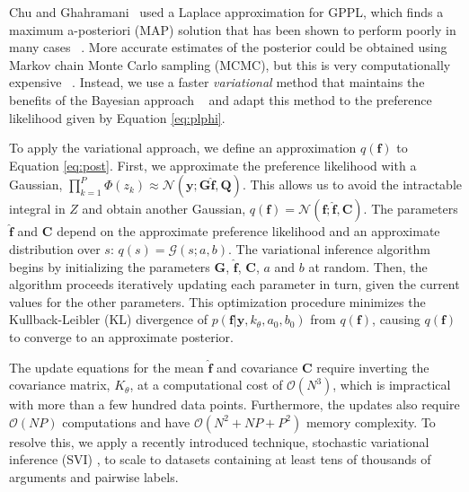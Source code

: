 Chu and Ghahramani~
used a Laplace approximation for GPPL, which finds a maximum a-posteriori (MAP) solution
that has been shown to perform poorly in many cases
~\cite{nickisch2008approximations}. 
More accurate estimates of the posterior could be obtained using Markov chain Monte Carlo sampling (MCMC),
but this is very computationally expensive ~\cite{nickisch2008approximations}. 
Instead, we use a faster \emph{variational} method that maintains the benefits of the Bayesian approach
~\cite{reece2011determining,steinberg2014extended} and adapt this method 
to the preference likelihood given by Equation \ref{eq:plphi}.

To apply the variational approach, we define an approximation $q(\mathbf f)$ to Equation \ref{eq:post}. 
First, we approximate the preference likelihood with a Gaussian, $\prod_{k=1}^P \Phi\left( z_k \right) \approx \mathcal{N}(\mathbf y; \mathbf G\hat{\mathbf f}, \mathbf Q)$. This allows us to avoid the intractable integral in $Z$ and obtain another Gaussian, $q(\mathbf f) = \mathcal{N}(\mathbf f; \hat{\mathbf f}, \mathbf C)$. 
The parameters $\hat{\mathbf f}$ and $\mathbf C$ 
depend on the approximate preference likelihood 
and an approximate distribution over $s$: $q(s) = \mathcal{G}(s; a, b)$. 
The variational inference algorithm begins by initializing the parameters $\mathbf G$, $ \hat{\mathbf f}$, $\mathbf C$, $a$ and $b$ at random. Then, the  algorithm proceeds iteratively updating each parameter in turn, given the current values for the other parameters. 
This optimization procedure minimizes the Kullback-Leibler (KL) divergence of $p(\mathbf f |\mathbf y, k_{\theta}, a_0, b_0)$ from $q(\mathbf f)$, causing $q(\mathbf f)$ to converge to an approximate posterior. 

The update equations for the mean $\hat{\mathbf f}$ and covariance $\mathbf C$ require inverting the covariance matrix, $K_{\theta}$, at a computational cost of $\mathcal{O}(N^3)$, which is impractical with more than a few hundred data points. 
Furthermore, the updates also require $\mathcal{O}(NP)$ computations and
have $\mathcal{O}(N^2 + NP + P^2)$ memory complexity.
To resolve this, 
we apply a recently introduced technique, stochastic variational inference (SVI) 
\cite{hoffman2013stochastic,hensman_scalable_2015},
to scale to datasets containing at least tens of thousands of arguments and pairwise labels.

